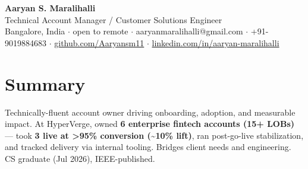 \documentclass[10pt,a4paper]{article}
\begin{document}
\vspace*{-1cm}
\begin{center}
{\LARGE\bfseries Aaryan S. Maralihalli}\\[0.5em]
{\large Technical Account Manager / Customer Solutions Engineer}\\[0.3em]
Bangalore, India $\cdot$ open to remote $\cdot$ aaryanmaralihalli@gmail.com $\cdot$ +91-9019884683 $\cdot$ \href{https://github.com/Aaryansm11}{github.com/Aaryansm11} $\cdot$ \href{https://linkedin.com/in/aaryan-maralihalli}{linkedin.com/in/aaryan-maralihalli}
\end{center}\vspace{0.4ex}
\section*{Summary}
Technically-fluent account owner driving onboarding, adoption, and measurable impact. At HyperVerge, owned \textbf{6 enterprise fintech accounts (15+ LOBs)} --- took \textbf{3 live at \textgreater{}95\% conversion (\textasciitilde{}10\% lift)}, ran post-go-live stabilization, and tracked delivery via internal tooling. Bridges client needs and engineering. CS graduate (Jul 2026), IEEE-published.\par\vspace{2pt}
\end{document}
